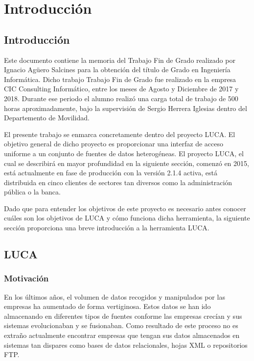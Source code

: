 \chapter{Introducción}

\minitoc
	
\section{Introducción}

Este documento contiene la memoria del Trabajo Fin de Grado realizado por Ignacio Agüero Salcines para la obtención del título de Grado en Ingeniería Informática. Dicho trabajo Trabajo Fin de Grado fue realizado en la empresa CIC Consulting Informático, entre los meses de Agosto y Diciembre de 2017 y 2018. Durante ese periodo el alumno realizó una carga total de trabajo de 500 horas aproximadamente, bajo la supervisión de Sergio Herrera Iglesias dentro del Departemento de Movilidad.

El presente trabajo se enmarca concretamente dentro del proyecto LUCA. El objetivo general de dicho proyecto es proporcionar una interfaz de acceso uniforme a un conjunto de fuentes de datos heterogéneas. El proyecto LUCA, el cual se describirá en mayor profundidad en la siguiente sección, comenzó en 2015, está actualmente en fase de producción con la versión 2.1.4 activa, está distribuida en cinco clientes de sectores tan diversos como la administración pública o la banca.

Dado que para entender los objetivos de este proyecto es necesario antes conocer cuáles son los objetivos de LUCA y cómo funciona dicha herramienta, la siguiente sección proporciona una breve introducción a la herramienta LUCA.

\section{LUCA}

\subsection{Motivación}

En los últimos años, el volumen de datos recogidos y manipulados por las empresas ha aumentado de forma vertiginosa. Estos datos se han ido almacenando en diferentes tipos de fuentes conforme las empresas crecían y sus sistemas evolucionaban y se fusionaban. Como resultado de  este proceso no es extraño actualmente encontrar empresas que tengan sus datos almacenados en sistemas tan dispares como bases de datos relacionales, hojas XML o repositorios FTP.

